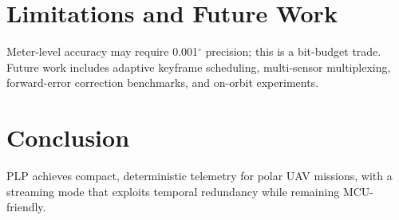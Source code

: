 \documentclass[conference]{IEEEtran}
\begin{document}
\section{Limitations and Future Work}
Meter-level accuracy may require 0.001$^\circ$ precision; this is a bit-budget trade. Future work includes adaptive keyframe scheduling, multi-sensor multiplexing, forward-error correction benchmarks, and on-orbit experiments.
\section{Conclusion}
PLP achieves compact, deterministic telemetry for polar UAV missions, with a streaming mode that exploits temporal redundancy while remaining MCU-friendly.


\end{document}
